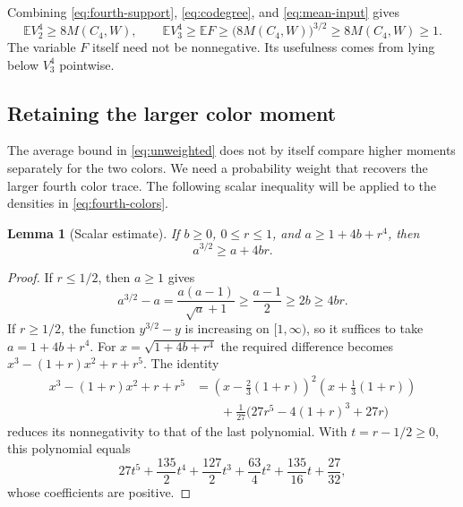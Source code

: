 \documentclass[11pt,a4paper]{article}
\newtheorem{lemma}[theorem]{Lemma}
\theoremstyle{remark}
\numberwithin{equation}{section}
\newcommand{\E}{\mathbb E}
\begin{document}
Combining \eqref{eq:fourth-support}, \eqref{eq:codegree}, and
\eqref{eq:mean-input} gives
\begin{equation}\label{eq:unweighted}
 \E V_2^4\geq8M(C_4,W),\qquad
 \E V_3^4\geq\E F\geq\bigl(8M(C_4,W)\bigr)^{3/2}
                          \geq8M(C_4,W)\geq1.
\end{equation}
The variable $F$ itself need not be nonnegative. Its usefulness
comes from lying below $V_3^4$ pointwise.

\subsection{Retaining the larger color moment}

The average bound in \eqref{eq:unweighted} does not by itself
compare higher moments separately for the two colors. We need a
probability weight that recovers the larger fourth color trace.
The following scalar inequality will be applied to the densities
in \eqref{eq:fourth-colors}.

\begin{lemma}[Scalar estimate]\label{lem:scalar-comparison}
If $b\geq0$, $0\leq r\leq1$, and $a\geq1+4b+r^4$, then
\begin{equation}\label{eq:scalar-comparison}
 a^{3/2}\geq a+4br.
\end{equation}
\end{lemma}
\begin{proof}
If $r\leq1/2$, then $a\geq1$ gives
\[
 a^{3/2}-a=\frac{a(a-1)}{\sqrt a+1}
             \geq\frac{a-1}{2}\geq2b\geq4br.
\]
If $r\geq1/2$, the function $y^{3/2}-y$ is increasing on
$[1,\infty)$, so it suffices to take $a=1+4b+r^4$.
For $x=\sqrt{1+4b+r^4}$ the required difference becomes
$x^3-(1+r)x^2+r+r^5$. The identity
\begin{align*}
 x^3-(1+r)x^2+r+r^5
 &=(x-\tfrac23(1+r))^2(x+\tfrac13(1+r))\\
 &\qquad+\tfrac1{27}\bigl(27r^5-4(1+r)^3+27r\bigr)
\end{align*}
reduces its nonnegativity to that of the last polynomial.
With $t=r-1/2\geq0$, this polynomial equals
\[
 27t^5+\frac{135}{2}t^4+\frac{127}{2}t^3
       +\frac{63}{4}t^2+\frac{135}{16}t+\frac{27}{32},
\]
whose coefficients are positive.
\end{proof}
\end{document}
